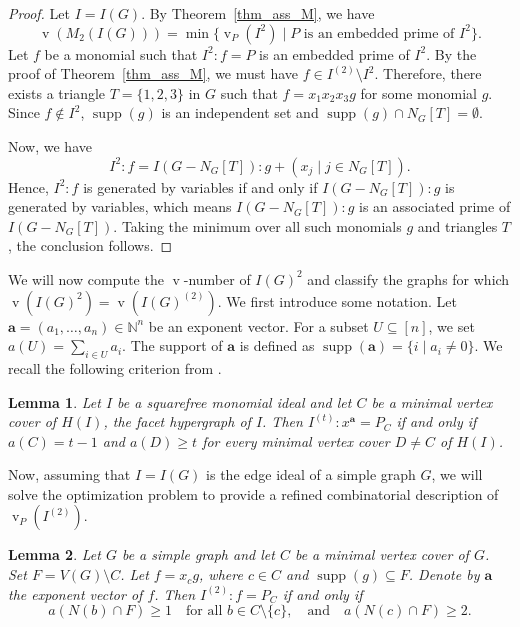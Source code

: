 \documentclass[12pt]{amsart}
\def\v{\operatorname{v}}
\def\supp{\operatorname{supp}}
\newtheorem{lemma}{Lemma}[section]
\begin{document}
\begin{proof} 
Let $I = I(G)$. By Theorem~\ref{thm_ass_M}, we have 
$$\v(M_2(I(G))) = \min \{ \v_P(I^2) \mid P \text{ is an embedded prime of } I^2 \}.$$
Let $f$ be a monomial such that $I^2 : f = P$ is an embedded prime of $I^2$. By the proof of Theorem~\ref{thm_ass_M}, we must have $f \in I^{(2)} \setminus I^2$. Therefore, there exists a triangle $T = \{1,2,3\}$ in $G$ such that $f = x_1 x_2 x_3 g$ for some monomial $g$. Since $f \notin I^2$, $\supp(g)$ is an independent set and $\operatorname{supp}(g) \cap N_G[T] = \emptyset$. 

Now, we have 
$$I^2 : f = I(G - N_G[T]) : g + (x_j \mid j \in N_G[T]).$$
Hence, $I^2 : f$ is generated by variables if and only if $I(G - N_G[T]) : g$ is generated by variables, which means $I(G - N_G[T]) : g$ is an associated prime of $I(G - N_G[T])$. Taking the minimum over all such monomials $g$ and triangles $T$, the conclusion follows.
\end{proof}

We will now compute the $\v$-number of $I(G)^2$ and classify the graphs for which $\v(I(G)^2) = \v(I(G)^{(2)})$. We first introduce some notation. Let $\mathbf{a} = (a_1, \ldots, a_n) \in \mathbb{N}^n$ be an exponent vector. For a subset $U \subseteq [n]$, we set $a(U) = \sum_{i \in U} a_i$. The support of $\mathbf{a}$ is defined as $\operatorname{supp}(\mathbf{a}) = \{ i \mid a_i \neq 0 \}$. We recall the following criterion from \cite{chjv26}.

\begin{lemma}
Let $I$ be a squarefree monomial ideal and let $C$ be a minimal vertex cover of $H(I)$, the facet hypergraph of $I$. Then $I^{(t)} : x^{\mathbf{a}} = P_C$ if and only if $a(C) = t - 1$ and $a(D) \ge t$ for every minimal vertex cover $D \neq C$ of $H(I)$.    
\end{lemma}

Now, assuming that $I = I(G)$ is the edge ideal of a simple graph $G$, we will solve the optimization problem to provide a refined combinatorial description of $\v_P(I^{(2)})$.

\begin{lemma}\label{lem_c_2} 
Let $G$ be a simple graph and let $C$ be a minimal vertex cover of $G$. Set $F = V(G) \setminus C$. Let $f = x_c g$, where $c \in C$ and $\operatorname{supp}(g) \subseteq F$. Denote by $\mathbf{a}$ the exponent vector of $f$. Then $I^{(2)} : f = P_C$ if and only if 
$$a(N(b) \cap F) \ge 1 \quad \text{for all } b \in C \setminus \{c\}, \quad \text{and} \quad a(N(c) \cap F) \ge 2.$$
\end{lemma}
\end{document}
